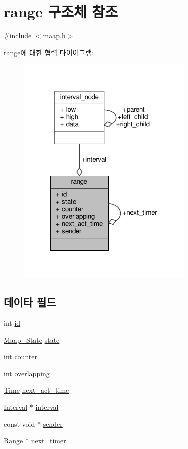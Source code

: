 \hypertarget{structrange}{}\section{range 구조체 참조}
\label{structrange}


{\ttfamily \#include $<$maap.\+h$>$}



range에 대한 협력 다이어그램\+:
\nopagebreak
\begin{figure}[H]
\begin{center}
\leavevmode
\includegraphics[width=240pt]{structrange__coll__graph}
\end{center}
\end{figure}
\subsection*{데이타 필드}
\begin{DoxyCompactItemize}
\item 
int \hyperlink{structrange_a7441ef0865bcb3db9b8064dd7375c1ea}{id}
\item 
\hyperlink{maap_8h_a683b69c2f503f6c19577bca59530533b}{Maap\+\_\+\+State} \hyperlink{structrange_afb8e4b0a842160bfedbee377952d8dde}{state}
\item 
int \hyperlink{structrange_a617a47c70795bcff659815ad0efd2266}{counter}
\item 
int \hyperlink{structrange_a2525856385331d88032dd796949d83ab}{overlapping}
\item 
\hyperlink{maap__timer_8h_a820ab516df7068a95c9e59f09e82859b}{Time} \hyperlink{structrange_a612425de4bd924a67f8e553419d979ba}{next\+\_\+act\+\_\+time}
\item 
\hyperlink{intervals_8h_af6f1ab89800839a9266a6dd11c2bc7ce}{Interval} $\ast$ \hyperlink{structrange_a07955c04c790953cbbcc9305fda01a0a}{interval}
\item 
const void $\ast$ \hyperlink{structrange_a6da9953a2443ab3bd33eea3534c01fdd}{sender}
\item 
\hyperlink{maap_8h_a7224b59335de60a4d7328209ed591ac5}{Range} $\ast$ \hyperlink{structrange_a3c89fc489da1e4f9bad21fbdb15e2386}{next\+\_\+timer}
\end{DoxyCompactItemize}


